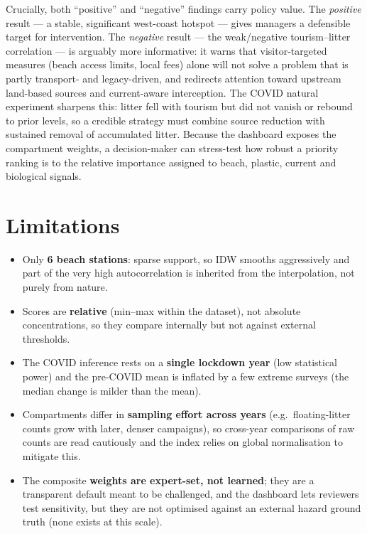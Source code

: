 \documentclass[11pt,a4paper]{article}
\begin{document}
Crucially, both ``positive'' and ``negative'' findings carry policy value. The \emph{positive}
result --- a stable, significant west-coast hotspot --- gives managers a defensible target for
intervention. The \emph{negative} result --- the weak/negative tourism--litter correlation --- is
arguably more informative: it warns that visitor-targeted measures (beach access limits, local
fees) alone will not solve a problem that is partly transport- and legacy-driven, and redirects
attention toward upstream land-based sources and current-aware interception. The COVID natural
experiment sharpens this: litter fell with tourism but did not vanish or rebound to prior levels,
so a credible strategy must combine source reduction with sustained removal of accumulated litter.
Because the dashboard exposes the compartment weights, a decision-maker can stress-test how
robust a priority ranking is to the relative importance assigned to beach, plastic, current and
biological signals.

\section{Limitations}
\begin{itemize}
\item Only \textbf{6 beach stations}: sparse support, so IDW smooths aggressively and part of the
very high autocorrelation is inherited from the interpolation, not purely from nature.
\item Scores are \textbf{relative} (min--max within the dataset), not absolute concentrations, so
they compare internally but not against external thresholds.
\item The COVID inference rests on a \textbf{single lockdown year} (low statistical power) and the
pre-COVID mean is inflated by a few extreme surveys (the median change is milder than the mean).
\item Compartments differ in \textbf{sampling effort across years} (e.g.\ floating-litter counts
grow with later, denser campaigns), so cross-year comparisons of raw counts are read cautiously and
the index relies on global normalisation to mitigate this.
\item The composite \textbf{weights are expert-set, not learned}; they are a transparent default
meant to be challenged, and the dashboard lets reviewers test sensitivity, but they are not
optimised against an external hazard ground truth (none exists at this scale).
\end{itemize}
\end{document}
